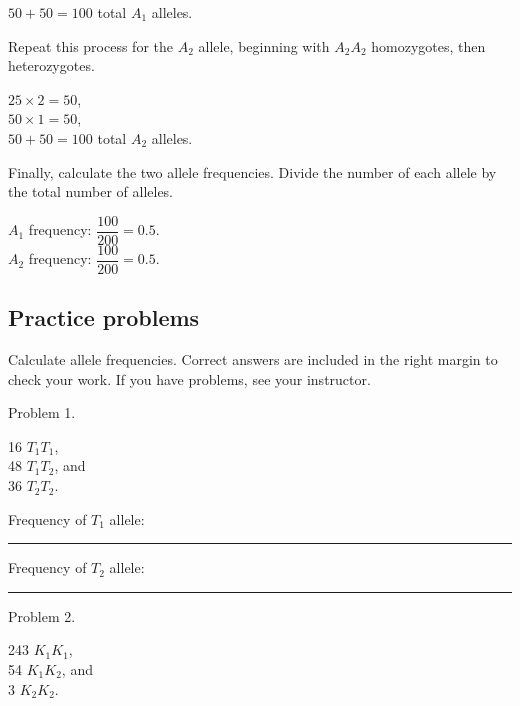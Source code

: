 \documentclass[letterpaper]{tufte-handout}
\begin{document}
$50 + 50 = 100$ total $A_1$ alleles.
\vspace{\baselineskip}

Repeat this process for the $A_2$ allele, beginning with 
$A_2A_2$ homozygotes, then heterozygotes.
\vspace{\baselineskip}

$25 \times 2 = 50$,\\
$50 \times 1 = 50$,\\
$50 + 50 = 100$ total $A_2$ alleles.
\vspace{\baselineskip}

Finally, calculate the two allele frequencies. Divide the number of each allele by the total number of alleles. \vspace{\baselineskip}

$A_1$ frequency: $\dfrac{100}{200} = 0.5.$\\[1.5ex]
$A_2$ frequency: $\dfrac{100}{200} = 0.5.$

\subsection{Practice problems}

Calculate allele frequencies. 
Correct answers are included in the right margin
to check your work. If you have problems, see your instructor. \vspace{\baselineskip}

\noindent Problem 1.\vspace{\baselineskip}

16 $T_1T_1$, \\
48 $T_1T_2$, and \\
36 $T_2T_2$.

\vspace{\baselineskip}

Frequency of $T_1$ allele: \rule{1in}{0.4pt} 

\vspace{\baselineskip}

Frequency of $T_2$ allele: \rule{1in}{0.4pt} 

\vspace{\baselineskip}


\noindent Problem 2.\vspace{\baselineskip}

243 $K_1K_1$, \\
54 $K_1K_2$, and \\
3 $K_2K_2$.
\end{document}
